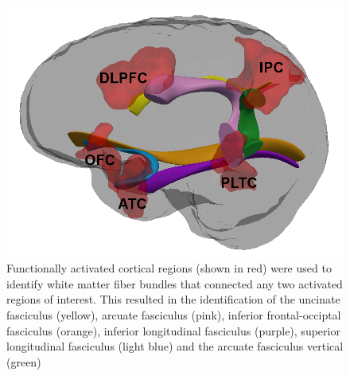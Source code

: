 \begin{figure}[h]
\begin{center}
\includegraphics[width=1.0\linewidth]{figures/big_homo_labeled.png}
\caption{Functionally activated cortical regions (shown in red) were used to identify white matter fiber bundles that connected any two activated regions of interest. This resulted in the identification of the uncinate fasciculus (yellow), arcuate fasciculus (pink), inferior frontal-occiptal fasciculus (orange), inferior longitudinal fasciculus (purple), superior longitudinal fasciculus (light blue) and the arcuate fasciculus vertical (green)}
\label{fig:networkmodel}
\end{center}
\end{figure}

